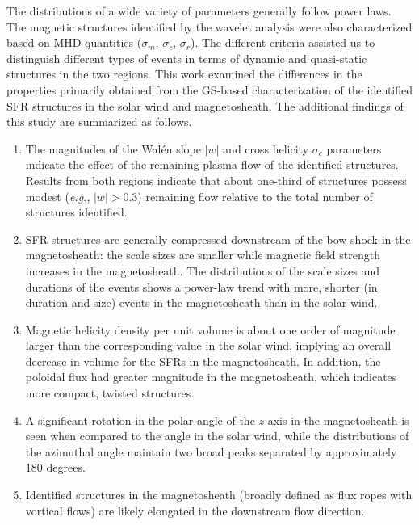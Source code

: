 The distributions of a wide variety of parameters generally follow power laws. The magnetic structures identified by the wavelet analysis were also characterized based on MHD quantities ($\sigma_m$, $\sigma_c$, $\sigma_r$). The different criteria assisted us to distinguish different types of events in terms of dynamic and quasi-static structures in the two regions. This work examined the differences in the properties primarily obtained from the GS-based characterization of the identified SFR structures in the solar wind and magnetosheath. The additional findings of this study are summarized as follows.
\begin{enumerate}
    \item The magnitudes of the Wal\'en slope $|w|$ and cross helicity $\sigma_c$ parameters indicate the effect of the remaining plasma flow of the identified structures. Results from both regions indicate that about one-third of structures possess modest (\textit{e.g.}, $|w|>0.3$) remaining flow relative to the total number of structures identified.
    \item SFR structures are generally compressed downstream of the bow shock in the magnetosheath: the scale sizes are smaller while magnetic field strength increases in the magnetosheath. The distributions of the scale sizes and durations of the events shows a power-law trend with more, shorter (in duration and size) events in the magnetosheath than in the solar wind.
    \item Magnetic helicity density per unit volume is about one order of magnitude larger than the corresponding value in the solar wind, implying an overall decrease in volume for the SFRs in the magnetosheath. In addition, the poloidal flux had greater magnitude in the magnetosheath, which indicates more compact, twisted structures.
    \item A significant rotation in the polar angle of the $z$-axis in the magnetosheath is seen when compared to the angle in the solar wind, while the distributions of the azimuthal angle maintain two broad peaks separated by approximately 180 degrees.
    \item Identified structures in the magnetosheath (broadly defined as flux ropes with vortical flows) are likely elongated in the downstream flow direction.
\end{enumerate}

